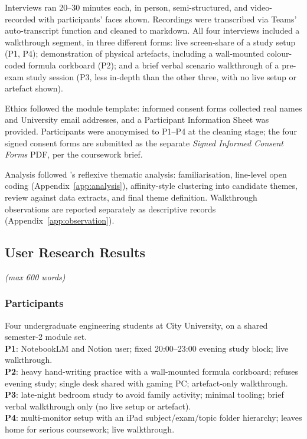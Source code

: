 \documentclass[a4paper,11pt]{article}
\newcommand{\wclimit}[1]{\hfill\textit{\footnotesize(max #1 words)}}
\begin{document}
Interviews ran 20--30 minutes each, in person, semi-structured, and
video-recorded with participants' faces shown. Recordings were
transcribed via Teams' auto-transcript function and cleaned to
markdown. All four interviews included a walkthrough segment, in
three different forms: live screen-share of a study setup (P1, P4);
demonstration of physical artefacts, including a wall-mounted
colour-coded formula corkboard (P2); and a brief verbal
scenario walkthrough of a pre-exam study session (P3, less in-depth
than the other three, with no live setup or artefact shown).

Ethics followed the module template: informed consent forms
collected real names and University email addresses, and a
Participant Information Sheet was provided. Participants were
anonymised to P1--P4 at the cleaning stage; the four signed
consent forms are submitted as the separate \emph{Signed Informed
Consent Forms} PDF, per the coursework brief.

Analysis followed \textcite{braun2006}'s reflexive thematic
analysis: familiarisation, line-level open coding
(Appendix~\ref{app:analysis}), affinity-style clustering into
candidate themes, review against data extracts, and final theme
definition. Walkthrough observations are reported separately as
descriptive records (Appendix~\ref{app:observation}).
\subsection{User Research Results}\label{sec:results}
\wclimit{600}

\subsubsection*{Participants}

Four undergraduate engineering students at City University, on
a shared semester-2 module set.\\ \textbf{P1}: NotebookLM and Notion
user; fixed 20:00--23:00 evening study block; live walkthrough.
\\ \textbf{P2}: heavy hand-writing practice with a wall-mounted formula
corkboard; refuses evening study; single desk shared with gaming PC;
artefact-only walkthrough.\\ \textbf{P3}: late-night bedroom study to
avoid family activity; minimal tooling; brief verbal walkthrough
only (no live setup or artefact).
\\ \textbf{P4}: multi-monitor setup with an iPad subject/exam/topic
folder hierarchy; leaves home for serious coursework; live walkthrough.
\end{document}
